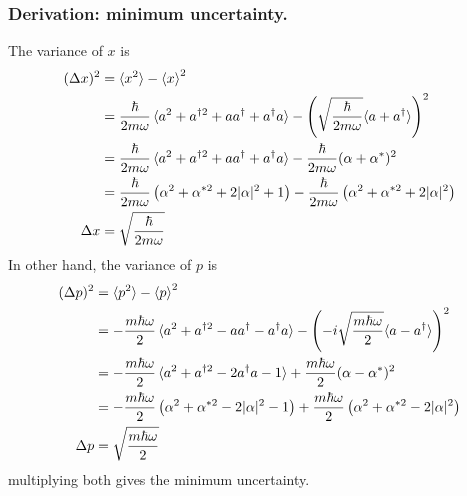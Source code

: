 \documentclass[../../../main.tex]{subfiles}
\begin{document}
\subsubsection{Derivation: minimum uncertainty.}
The variance of $x$ is
\begin{align*}
  (\Delta x)^2 & =  \braket{x^2 } - \braket{x }^2                                                                                                                                        \\
               & = \frac{\hbar}{2m\omega} \braket{a^2 + a^{\dagger 2} + aa^\dagger + a^\dagger a  }
  - \left( \sqrt{\frac{\hbar}{2m\omega}} \langle a + a^{\dagger} \rangle \right) ^2                                                                                                      \\
               & = \frac{\hbar}{2m\omega} \braket{a^2 + a^{\dagger 2} + aa^\dagger + a^\dagger a }- \frac{\hbar}{2m\omega} (\alpha + \alpha^{*})^2                                       \\
               & =\frac{\hbar}{2 m \omega} \left( \alpha^{2} + \alpha^{*2} + 2 |\alpha|^{2} + 1 \right)  - \frac{\hbar}{2 m \omega} \left( \alpha^2 + \alpha^{*2} + 2 |\alpha|^2 \right) \\
  \Delta x
               & = \sqrt{\frac{\hbar  }{2m\omega}}
\end{align*}
In other hand, the variance of $p$ is
\begin{align*}
  (\Delta p)^2 & =  \braket{p^2 } - \braket{p }^2                                                                                                                                               \\
               & = - \frac{m\hbar\omega}{2} \braket{a^2 + a^{\dagger 2} -aa^\dagger - a^\dagger a  }
  - \left( -i\sqrt{\frac{m\hbar\omega}{2}} \langle a - a^{\dagger} \rangle \right) ^2                                                                                                           \\
               & = - \frac{m\hbar\omega}{2} \braket{a^2 + a^{\dagger 2} -2 a^\dagger a-1 } + \frac{m\hbar\omega}{2} (\alpha - \alpha^{*})^2                                                     \\
               & = - \frac{ m \hbar  \omega}{2 } \left( \alpha^{2} + \alpha^{*2} - 2 |\alpha|^{2} -1 \right)  + \frac{m \hbar  \omega}{2 } \left( \alpha^2 + \alpha^{*2} - 2 |\alpha|^2 \right) \\
  \Delta p
               & = \sqrt{\frac{m  \hbar \omega }{2}}
\end{align*}
multiplying both gives the minimum uncertainty.
\end{document}
